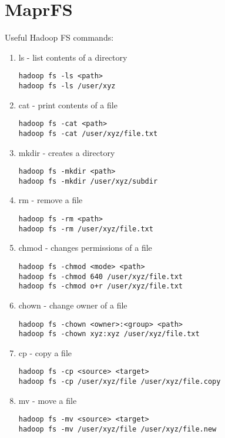 \documentclass[11pt]{article}
\begin{document}
\section*{MaprFS}

Useful Hadoop FS commands:
\begin{enumerate}
\item ls - list contents of a directory
\begin{lstlisting}
hadoop fs -ls <path>
hadoop fs -ls /user/xyz
\end{lstlisting}

\item cat - print contents of a file
\begin{lstlisting}
hadoop fs -cat <path>
hadoop fs -cat /user/xyz/file.txt
\end{lstlisting}

\item mkdir - creates a directory
\begin{lstlisting}
hadoop fs -mkdir <path>
hadoop fs -mkdir /user/xyz/subdir
\end{lstlisting}
 
\item rm - remove a file
\begin{lstlisting}
hadoop fs -rm <path>
hadoop fs -rm /user/xyz/file.txt
\end{lstlisting}

\item chmod - changes permissions of a file
\begin{lstlisting}
hadoop fs -chmod <mode> <path>
hadoop fs -chmod 640 /user/xyz/file.txt
hadoop fs -chmod o+r /user/xyz/file.txt
\end{lstlisting}

\item chown - change owner of a file
\begin{lstlisting}
hadoop fs -chown <owner>:<group> <path>
hadoop fs -chown xyz:xyz /user/xyz/file.txt
\end{lstlisting}

\item cp - copy a file
\begin{lstlisting}
hadoop fs -cp <source> <target>
hadoop fs -cp /user/xyz/file /user/xyz/file.copy
\end{lstlisting}

\item mv - move a file
\begin{lstlisting}
hadoop fs -mv <source> <target>
hadoop fs -mv /user/xyz/file /user/xyz/file.new
\end{lstlisting}


\end{enumerate}
\end{document}

